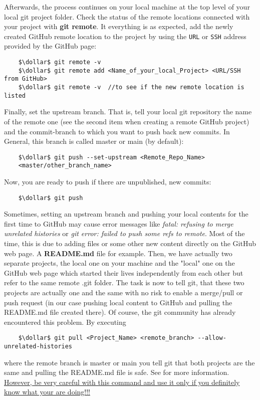 Afterwards, the process continues on your local machine at the top level of your local git project folder. Check the status of the remote locations connected with 
your project with \textbf{git remote}. It everything is as expected, add the newly created GitHub remote location to the project by using the \verb|URL| or \verb|SSH|
address provided by the GitHub page:

\begin{lstlisting}
	$\dollar$ git remote -v
	$\dollar$ git remote add <Name_of_your_local_Project> <URL/SSH from GitHub>
	$\dollar$ git remote -v  //to see if the new remote location is listed
\end{lstlisting}

Finally, set the upstream branch. That is, tell your local git repository the name of the remote one (see the second item when creating a remote GitHub project) and the 
commit-branch to which you want to push back new commits. In General, this branch is called master or main (by default):

\begin{lstlisting}
	$\dollar$ git push --set-upstream <Remote_Repo_Name> 
	<master/other_branch_name>
\end{lstlisting}
Now, you are ready to push if there are unpublished, new commits:
\begin{lstlisting}
	$\dollar$ git push
\end{lstlisting}
Sometimes, setting an upstream branch and pushing your local contents for the first time to GitHub may cause error messages like \textit{fatal: refusing to merge
unrelated histories} or \textit{git error: failed to push some refs to remote}. Most of the time, this is due to adding files or some other new content directly 
on the GitHub web page. A \textbf{README.md} file for example. Then, we have actually two separate projects, the local one on your machine and the "local" one on the 
GitHub web page which started their lives independently from each other but refer to the same remote .git folder. The task is now to tell git, that these two projects
are actually one and the same with no risk to enable a merge/pull or push request (in our case pushing local content to GitHub and pulling the README.md file created there).  
Of course, the git community has already encountered this problem. By executing   
\begin{lstlisting}
	$\dollar$ git pull <Project_Name> <remote_branch> --allow-unrelated-histories
\end{lstlisting}
where the remote branch is master or main you tell git that both projects are the same and pulling the README.md file is safe. See \cite{Git2021git-merge} for more
information.
\\
\ul{However, be very careful with this command and use it only if you definitely know what your are doing!!!}







